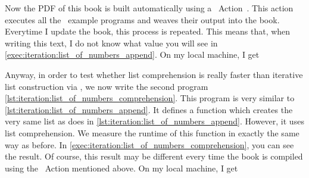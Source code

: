 Now the PDF of this book is built automatically using a \github~Action~\cite{C2024GA}.
This action executes all the \python\ example programs and weaves their output into the book.
Everytime I update the book, this process is repeated.
This means that, when writing this text, I do not know what value you will see in \cref{exec:iteration:list_of_numbers_append}.
On my local machine, I get 

Anyway, in order to test whether list comprehension is really faster than iterative list construction via , we now write the second program \cref{lst:iteration:list_of_numbers_comprehension}.
This program is very similar to \cref{lst:iteration:list_of_numbers_append}.
It defines a function  which creates the very same list as  does in \cref{lst:iteration:list_of_numbers_append}.
However, it uses list comprehension.
We measure the runtime of this function in exactly the same way as before.
In \cref{exec:iteration:list_of_numbers_comprehension}, you can see the result.
Of course, this result may be different every time the book is compiled using the \github~Action mentioned above.
On my local machine, I get 


